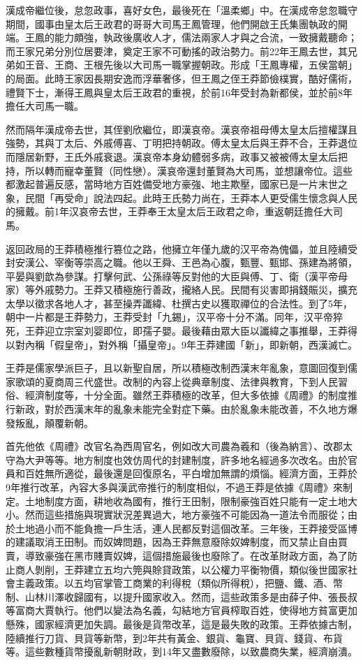 漢成帝繼位後，怠忽政事，喜好女色，最後死在「溫柔鄉」中。在漢成帝怠忽職守期間，國事由皇太后王政君的哥哥大司馬王鳳管理，他們開啟王氏集團執政的開端。王鳳的能力頗強，執政後廣收人才，儒法兩家人才與之合流，一致擁戴聽命；而王家兄弟分別位居要津，奠定王家不可動搖的政治勢力。前22年王鳳去世，其兄弟如王音、王商、王根先後以大司馬一職掌握朝政。形成「王鳳專權，五侯當朝」的局面。此時王家因長期安逸而浮華奢侈，但王鳳之侄王莽節儉樸實，酷好儒術，禮賢下士，漸得王鳳與皇太后王政君的重視，於前16年受封為新都侯，並於前8年擔任大司馬一職。

然而隔年漢成帝去世，其侄劉欣繼位，即漢哀帝。漢哀帝祖母傅太皇太后擅權謀且強勢，其與丁太后、外戚傅喜、丁明把持朝政。傅太皇太后與王莽不合，王莽退位而隱居新野，王氏外戚衰退。漢哀帝本身幼體弱多病，政事又被被傅太皇太后把持，所以轉而寵幸董賢（同性戀）。漢哀帝還封董賢為大司馬，並想讓帝位。這些都激起普遍反感，當時地方百姓備受地方豪強、地主欺壓，國家已是一片末世之象，民間「再受命」說法四起。此時王氏勢力尚在，王莽本人更受儒生懷念與人民的擁戴。前1年汉哀帝去世，王莽奉王太皇太后王政君之命，重返朝廷擔任大司馬。

返回政局的王莽積極推行篡位之路，他擁立年僅九歲的汉平帝為傀儡，並且陸續受封安漢公、宰衡等崇高之職。他以王舜、王邑為心腹，甄豐、甄邯、孫建為將領，平晏與劉歆為參謀。打擊何武、公孫祿等反對他的大臣與傅、丁、衛（漢平帝母家）等外戚勢力。王莽又積極施行善政，攏絡人民。民間有災害即捐錢賑災，擴充太學以徵求各地人才，甚至操弄讖緯、杜撰古史以獲取禪位的合法性。到了5年，朝中一片都是王莽勢力，王莽受封「九錫」，汉平帝十分不滿。同年，汉平帝猝死，王莽迎立宗室刘婴即位，即孺子嬰。最後藉由眾大臣以讖緯之事推舉，王莽得以對內稱「假皇帝」，對外稱「攝皇帝」。9年王莽建國「新」，即新朝，西漢滅亡。

王莽是儒家學派巨子，且以新聖自居，所以積極改制西漢末年亂象，意圖回復到儒家歌頌的夏商周三代盛世。改制的內容上從典章制度、法律與教育，下到人民習俗、經濟制度等，十分全面。雖然王莽積極的改革，但大多依據《周禮》的制度推行新政，對於西漢末年的亂象未能完全對症下藥。由於亂象未能改善，不久地方爆發叛亂，顛覆新朝。

首先他依《周禮》改官名為西周官名，例如改大司農為羲和（後為納言）、改郡太守為大尹等等。地方制度也效仿周代的封建制度，許多地名經過多次改名。由於官員和百姓無所適從，最後還是回復原名，平白增加無謂的煩惱。經濟方面，王莽於9年推行改革，內容大多與漢武帝推行的制度相似，不過王莽是依據《周禮》來制定。土地制度方面，耕地收為國有，推行王田制，限制豪強百姓只能有一定土地大小。然而這些措施與現實狀況差異過大，地方豪強不可能因為一道法令而服從；由於土地過小而不能負擔一戶生活，連人民都反對這個改革。三年後，王莽接受區博的建議取消王田制。而奴婢問題，因為王莽無意廢除奴婢制度，而又禁止自由買賣，導致豪強在黑市賤賣奴婢，這個措施最後也廢除了。在改革財政方面，為了防止商人剝削，王莽建立五均六筦與賒貸政策，以公權力平衡物價，類似後世國家社會主義政策。以五均官掌管工商業的利得稅（類似所得稅），把鹽、鐵、酒、幣制、山林川澤收歸國有，以提升國家收入。然而，這些政策多是由薛子仲、張長叔等富商大賈執行。他們以變法為名義，勾結地方官員榨取百姓，使得地方貧富更加懸殊，國家經濟更加失調。最後是貨幣改革，這是最失敗的政策。王莽依據古制，陸續推行刀貨、貝貨等新幣，到2年共有黃金、銀貨、龜寶、貝貨、錢貨、布貨等。這些數種貨幣擾亂新朝財政，到14年又盡數廢除，以致農商失業，經濟崩潰。

